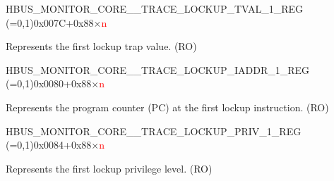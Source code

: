 \begin{register}{H}{BUS\_MONITOR\_CORE\_\_TRACE\_LOCKUP\_TVAL\_1\_REG (=0,1)}{0x007C+0x88×\textcolor{red}{n}}\label{regdesc:BUSMONITORCORE0TRACELOCKUPTVAL1REG}
%
\regnewline%
\begin{regdesc}\begin{reglist}
\label{fielddesc:BUSMONITORCORE0TRACELOCKUPRECORDINGTVAL1}\item [BUS\_MONITOR\_CORE\_\regindex{n}\_TRACE\_LOCKUP\_RECORDING\_TVAL\_1] Represents the first lockup trap value. (RO)
\end{reglist}\end{regdesc}
\end{register}


\begin{register}{H}{BUS\_MONITOR\_CORE\_\_TRACE\_LOCKUP\_IADDR\_1\_REG (=0,1)}{0x0080+0x88×\textcolor{red}{n}}\label{regdesc:BUSMONITORCORE0TRACELOCKUPIADDR1REG}
%
\regnewline%
\begin{regdesc}\begin{reglist}
\label{fielddesc:BUSMONITORCORE0TRACELOCKUPRECORDINGIADDR1}\item [BUS\_MONITOR\_CORE\_\regindex{n}\_TRACE\_LOCKUP\_RECORDING\_IADDR\_1] Represents the program counter (PC) at the first lockup instruction. (RO)


\end{reglist}\end{regdesc}
\end{register}


\begin{register}{H}{BUS\_MONITOR\_CORE\_\_TRACE\_LOCKUP\_PRIV\_1\_REG (=0,1)}{0x0084+0x88×\textcolor{red}{n}}\label{regdesc:BUSMONITORCORE0TRACELOCKUPPRIV1REG}
%
%
\regnewline%
\begin{regdesc}\begin{reglist}
\label{fielddesc:BUSMONITORCORE0TRACELOCKUPRECORDINGPRIV1}\item [BUS\_MONITOR\_CORE\_\regindex{n}\_TRACE\_LOCKUP\_RECORDING\_PRIV\_1] Represents the first lockup privilege level. (RO)
\end{reglist}\end{regdesc}
\end{register}


